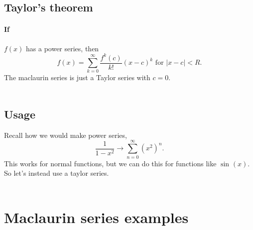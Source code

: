 \documentclass{report}
\begin{document}
\subsection*{Taylor's theorem}%
\label{sub:Taylor's theorem}
\paragraph{If} $ f\left( x \right)  $ has a power series, then 
\[
f\left( x \right)=\sum_{ k=0 } ^{ \infty } \frac{ f^{ k }\left( c \right)  }{ k! }\left( x-c \right) ^{ k } \text{ for } \left| x-c \right|<R
.\] 
The maclaurin series is just a Taylor series with $ c=0 $. \\ \\

\subsection*{Usage}%
\label{sub:Usage}
Recall how we would make power series,
\[
\frac{ 1 }{ 1-x^2 } \to \sum_{ n=0 } ^{ \infty } \left( x^2 \right) ^{ n }
.\] 
This works for normal functions, but we can do this for functions like $ \sin^{  } \left( x \right)  $. So let's instead use a taylor series.\\ \\
\section*{Maclaurin series examples}%
\label{sec:Maclaurin series examples}
\end{document}
